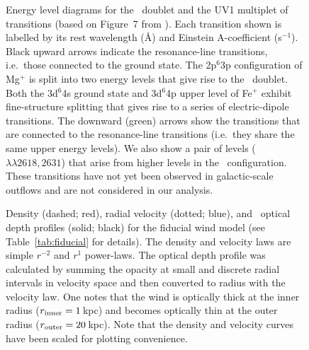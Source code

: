\documentclass[12pt,preprint]{aastex}
\begin{document}
\begin{figure}
\caption{
Energy level diagrams for the \mgiid\ doublet and the UV1
multiplet of  transitions   
(based on Figure~7 from \cite{hmt+99}).
Each transition shown is
labelled by its rest wavelength (\AA) and Einstein A-coefficient
(s$^{-1}$). Black upward arrows
indicate the resonance-line transitions, i.e.\ those connected to the ground
state.  The 2p$^6$3p configuration of Mg$^+$ is split into
two energy levels that give rise to the \mgiid\ doublet.  
Both the 3d$^6$4s ground state and 3d$^6$4p upper level of Fe$^+$
exhibit fine-structure splitting that gives rise to a series of
electric-dipole transitions. 
The downward (green) arrows show the transitions that are connected to the
resonance-line transitions (i.e.\ they share the same upper energy
levels).  We also show a pair of levels (~$\lambda\lambda
2618,2631$) that arise from higher levels in the \zconfig\
configuration.  These transitions have not yet been observed in
galactic-scale outflows and are not considered in our analysis.
}
\label{fig:energy}
\end{figure}

\begin{figure}
\caption{
Density (dashed; red), radial velocity (dotted; blue), and
\mgiia\ optical depth profiles (solid; black) for the fiducial
wind model (see Table~\ref{tab:fiducial} for details).
The density and velocity laws are simple $r^{-2}$ and $r^1$
power-laws.  The optical depth profile was calculated by summing
the opacity at small and discrete radial intervals in velocity space
and then converted to radius with the velocity law.  One notes that
the wind is optically thick at the inner radius ($r_{\rm inner} =
1$\,kpc) and becomes optically thin at the outer radius ($r_{\rm
  outer} = 20$\,kpc).
Note that the density and velocity curves have been scaled for plotting
convenience.  
}
\label{fig:fiducial_nvt}
\end{figure}
\end{document}
